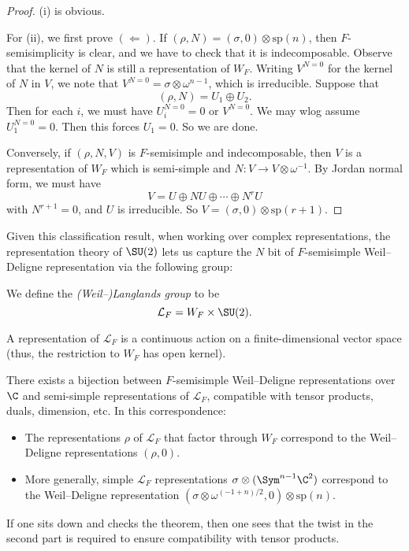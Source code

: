 \documentclass[a4paper]{article}
\renewcommand\sp{\mathrm{sp}}
\begin{document}
\begin{proof}
  (i) is obvious.

  For (ii), we first prove $(\Leftarrow)$. If $(\rho, N) = (\sigma, 0) \otimes \sp(n)$, then $F$-semisimplicity is clear, and we have to check that it is indecomposable. Observe that the kernel of $N$ is still a representation of $W_F$. Writing $V^{N = 0}$ for the kernel of $N$ in $V$, we note that $V^{N = 0} = \sigma \otimes \omega^{n - 1}$, which is irreducible. Suppose that
  \[
    (\rho, N) = U_1 \oplus U_2.
  \]
  Then for each $i$, we must have $U_i^{N = 0} = 0 $ or $V^{N = 0}$. We may wlog assume $U_1^{N = 0} = 0$. Then this forces $U_1 = 0$. So we are done.

  Conversely, if $(\rho, N, V)$ is $F$-semisimple and indecomposable, then $V$ is a representation of $W_F$ which is semi-simple and $N: V \to V \otimes \omega^{-1}$. By Jordan normal form, we must have
  \[
    V = U \oplus NU \oplus \cdots \oplus N^r U
  \]
  with $N^{r + 1} = 0$, and $U$ is irreducible. So $V = (\sigma, 0) \otimes \sp(r + 1)$.
\end{proof}

Given this classification result, when working over complex representations, the representation theory of $\SU(2)$ lets us capture the $N$ bit of $F$-semisimple Weil--Deligne representation via the following group:
\begin{defi}
  We define the \emph{(Weil--)Langlands group} to be
  \[
    \mathcal{L}_F = W_F \times \SU(2).
  \]
\end{defi}
A representation of $\mathcal{L}_F$ is a continuous action on a finite-dimensional vector space (thus, the restriction to $W_F$ has open kernel).

\begin{thm}
  There exists a bijection between $F$-semisimple Weil--Deligne representations over $\C$ and semi-simple representations of $\mathcal{L}_F$, compatible with tensor products, duals, dimension, etc. In this correspondence:
  \begin{itemize}
    \item The representations $\rho$ of $\mathcal{L}_F$ that factor through $W_F$ correspond to the Weil--Deligne representations $(\rho, 0)$.

    \item More generally, simple $\mathcal{L}_F$ representations $\sigma \otimes (\Sym^{n - 1} \C^2)$ correspond to the Weil--Deligne representation $(\sigma \otimes \omega^{(-1 + n)/2}, 0) \otimes \sp(n)$.\fakeqed
  \end{itemize}
\end{thm}
If one sits down and checks the theorem, then one sees that the twist in the second part is required to ensure compatibility with tensor products.
\end{document}
